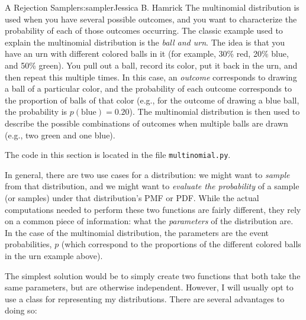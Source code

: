 \begin{aosachapter}{A Rejection Sampler}{s:sampler}{Jessica B. Hamrick}
The multinomial distribution is used when you have several possible
outcomes, and you want to characterize the probability of each of those
outcomes occurring. The classic example used to explain the multinomial
distribution is the \emph{ball and urn}. The idea is that you have an
urn with different colored balls in it (for example, 30\% red, 20\%
blue, and 50\% green). You pull out a ball, record its color, put it
back in the urn, and then repeat this multiple times. In this case, an
\emph{outcome} corresponds to drawing a ball of a particular color, and
the probability of each outcome corresponds to the proportion of balls
of that color (e.g., for the outcome of drawing a blue ball, the
probability is $p(\mathrm{blue})=0.20$). The multinomial distribution is
then used to describe the possible combinations of outcomes when
multiple balls are drawn (e.g., two green and one blue).

The code in this section is located in the file \texttt{multinomial.py}.

\label{the-multinomialdistribution-class}

In general, there are two use cases for a distribution: we might want to
\emph{sample} from that distribution, and we might want to
\emph{evaluate the probability} of a sample (or samples) under that
distribution's PMF or PDF. While the actual computations needed to
perform these two functions are fairly different, they rely on a common
piece of information: what the \emph{parameters} of the distribution
are. In the case of the multinomial distribution, the parameters are the
event probabilities, $p$ (which correspond to the proportions of the
different colored balls in the urn example above).

The simplest solution would be to simply create two functions that both
take the same parameters, but are otherwise independent. However, I will
usually opt to use a class for representing my distributions. There are
several advantages to doing so:

\begin{aosaenumerate}
\def\labelenumi{\arabic{enumi}.}


\end{aosaenumerate}
\end{aosachapter}
